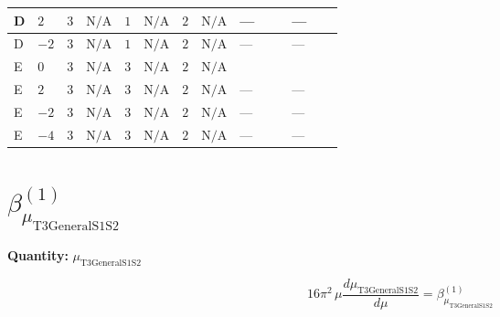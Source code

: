 \documentclass[8pt]{article}
\begin{document}
\begin{landscape}
\begin{longtable}{@{}llcccccc >{\raggedright\arraybackslash}p{0.21\linewidth} >{\raggedright\arraybackslash}p{0.21\linewidth}@{}}
\midrule
D & $2$ & $3$ & $\text{N/A}$ & $1$ & $\text{N/A}$ & $2$ & $\text{N/A}$ & --- & --- \\
\midrule
D & $-2$ & $3$ & $\text{N/A}$ & $1$ & $\text{N/A}$ & $2$ & $\text{N/A}$ & --- & --- \\
\midrule
E & $0$ & $3$ & $\text{N/A}$ & $3$ & $\text{N/A}$ & $2$ & $\text{N/A}$ & \scriptsize\adjustbox{max width=\linewidth}{$\begin{gathered} -4 {\lambda_{S_1}^{(A)}} {\lambda_{X_{18}}}\end{gathered}$} & \scriptsize\adjustbox{max width=\linewidth}{$\begin{gathered} +{\lambda_{HS_2}^{(1)}} (6 {\lambda_{X_{5}}^{(1)}}+2 {\lambda_{X_{5}}^{(2)}})\end{gathered}$} \\
\midrule
E & $2$ & $3$ & $\text{N/A}$ & $3$ & $\text{N/A}$ & $2$ & $\text{N/A}$ & --- & --- \\
\midrule
E & $-2$ & $3$ & $\text{N/A}$ & $3$ & $\text{N/A}$ & $2$ & $\text{N/A}$ & --- & --- \\
\midrule
E & $-4$ & $3$ & $\text{N/A}$ & $3$ & $\text{N/A}$ & $2$ & $\text{N/A}$ & --- & --- \\
\midrule
\bottomrule
\end{longtable}
\clearpage
\section*{$\beta_{{\mu_{\mathrm{T3GeneralS1S2}}}}^{(1)}$}
\noindent\textbf{Quantity: }${\mu_{\mathrm{T3GeneralS1S2}}}$\par\smallskip
\[16\pi^2\,\mu\frac{d {\mu_{\mathrm{T3GeneralS1S2}}}}{d\mu}=\beta_{{\mu_{\mathrm{T3GeneralS1S2}}}}^{(1)}\]

\end{landscape}
\end{document}
